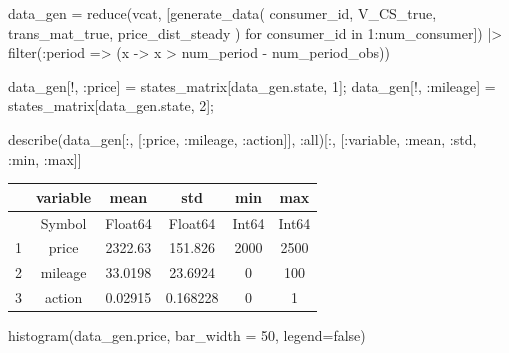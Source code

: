 \documentclass[
  letterpaper,
  DIV=11,
  numbers=noendperiod]{scrreprt}
\newenvironment{Shaded}{\begin{snugshade}}{\end{snugshade}}
\newcommand{\ConstantTok}[1]{\textcolor[rgb]{0.56,0.35,0.01}{#1}}
\newcommand{\FloatTok}[1]{\textcolor[rgb]{0.68,0.00,0.00}{#1}}
\newcommand{\FunctionTok}[1]{\textcolor[rgb]{0.28,0.35,0.67}{#1}}
\newcommand{\KeywordTok}[1]{\textcolor[rgb]{0.00,0.23,0.31}{#1}}
\newcommand{\NormalTok}[1]{\textcolor[rgb]{0.00,0.23,0.31}{#1}}
\newcommand{\OperatorTok}[1]{\textcolor[rgb]{0.37,0.37,0.37}{#1}}
\begin{document}
\begin{Shaded}
\begin{Highlighting}[]
\NormalTok{data\_gen }\OperatorTok{=} \FunctionTok{reduce}\NormalTok{(vcat, [}\FunctionTok{generate\_data}\NormalTok{(}
\NormalTok{    consumer\_id,}
\NormalTok{    V\_CS\_true,}
\NormalTok{    trans\_mat\_true,}
\NormalTok{    price\_dist\_steady}
\NormalTok{    ) for consumer\_id }\KeywordTok{in} \FloatTok{1}\OperatorTok{:}\NormalTok{num\_consumer]) }\OperatorTok{|\textgreater{}}
    \FunctionTok{filter}\NormalTok{(}\OperatorTok{:}\NormalTok{period }\OperatorTok{=\textgreater{}}\NormalTok{ (x }\OperatorTok{{-}\textgreater{}}\NormalTok{ x }\OperatorTok{\textgreater{}}\NormalTok{ num\_period }\OperatorTok{{-}}\NormalTok{ num\_period\_obs))}

\NormalTok{data\_gen[!, }\OperatorTok{:}\NormalTok{price] }\OperatorTok{=}\NormalTok{ states\_matrix[data\_gen.state, }\FloatTok{1}\NormalTok{];}
\NormalTok{data\_gen[!, }\OperatorTok{:}\NormalTok{mileage] }\OperatorTok{=}\NormalTok{ states\_matrix[data\_gen.state, }\FloatTok{2}\NormalTok{];}
\end{Highlighting}
\end{Shaded}

\begin{Shaded}
\begin{Highlighting}[]
\FunctionTok{describe}\NormalTok{(data\_gen[}\OperatorTok{:}\NormalTok{, [}\OperatorTok{:}\NormalTok{price, }\OperatorTok{:}\NormalTok{mileage, }\OperatorTok{:}\NormalTok{action]], }\OperatorTok{:}\NormalTok{all)[}\OperatorTok{:}\NormalTok{, [}\OperatorTok{:}\NormalTok{variable, }\OperatorTok{:}\NormalTok{mean, }\OperatorTok{:}\NormalTok{std, }\OperatorTok{:}\NormalTok{min, }\OperatorTok{:}\NormalTok{max]]}
\end{Highlighting}
\end{Shaded}

\begin{tabular}{r|ccccc}
    & variable & mean & std & min & max\\
    \hline
    & Symbol & Float64 & Float64 & Int64 & Int64\\
    \hline
    1 & price & 2322.63 & 151.826 & 2000 & 2500 \\
    2 & mileage & 33.0198 & 23.6924 & 0 & 100 \\
    3 & action & 0.02915 & 0.168228 & 0 & 1 \\
\end{tabular}

\begin{Shaded}
\begin{Highlighting}[]
\FunctionTok{histogram}\NormalTok{(data\_gen.price, bar\_width }\OperatorTok{=} \FloatTok{50}\NormalTok{, legend}\OperatorTok{=}\ConstantTok{false}\NormalTok{)}
\end{Highlighting}
\end{Shaded}
\end{document}
